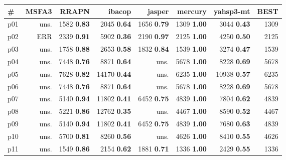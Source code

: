 \begin{tabular}{|l|rrrrrr|r|}
\hline
\textbf{\#} & \textbf{MSFA3} & \textbf{RRAPN} & \textbf{ibacop} & \textbf{jasper} & \textbf{mercury} & \textbf{yahsp3-mt} & \textbf{BEST}\\
\hline
p01 & uns. & {\footnotesize 1582} \textbf{0.83} & {\footnotesize 2045} \textbf{0.64} & {\footnotesize 1656} \textbf{0.79} & {\footnotesize 1309} \textbf{1.00} & {\footnotesize 3044} \textbf{0.43} & 1309\\
p02 & ERR & {\footnotesize 2339} \textbf{0.91} & {\footnotesize 5902} \textbf{0.36} & {\footnotesize 2190} \textbf{0.97} & {\footnotesize 2125} \textbf{1.00} & {\footnotesize 4250} \textbf{0.50} & 2125\\
p03 & uns. & {\footnotesize 1758} \textbf{0.88} & {\footnotesize 2653} \textbf{0.58} & {\footnotesize 1832} \textbf{0.84} & {\footnotesize 1539} \textbf{1.00} & {\footnotesize 3274} \textbf{0.47} & 1539\\
p04 & uns. & {\footnotesize 7448} \textbf{0.76} & {\footnotesize 8871} \textbf{0.64} & uns. & {\footnotesize 5678} \textbf{1.00} & {\footnotesize 8228} \textbf{0.69} & 5678\\
p05 & uns. & {\footnotesize 7628} \textbf{0.82} & {\footnotesize 14170} \textbf{0.44} & uns. & {\footnotesize 6235} \textbf{1.00} & {\footnotesize 10938} \textbf{0.57} & 6235\\
p06 & uns. & {\footnotesize 7448} \textbf{0.76} & {\footnotesize 8871} \textbf{0.64} & uns. & {\footnotesize 5678} \textbf{1.00} & {\footnotesize 8228} \textbf{0.69} & 5678\\
p07 & uns. & {\footnotesize 5140} \textbf{0.94} & {\footnotesize 11802} \textbf{0.41} & {\footnotesize 6452} \textbf{0.75} & {\footnotesize 4839} \textbf{1.00} & {\footnotesize 7804} \textbf{0.62} & 4839\\
p08 & uns. & {\footnotesize 5221} \textbf{0.86} & {\footnotesize 12762} \textbf{0.35} & uns. & {\footnotesize 4467} \textbf{1.00} & {\footnotesize 8590} \textbf{0.52} & 4467\\
p09 & uns. & {\footnotesize 5140} \textbf{0.94} & {\footnotesize 11802} \textbf{0.41} & {\footnotesize 6452} \textbf{0.75} & {\footnotesize 4839} \textbf{1.00} & {\footnotesize 7680} \textbf{0.63} & 4839\\
p10 & uns. & {\footnotesize 5700} \textbf{0.81} & {\footnotesize 8260} \textbf{0.56} & uns. & {\footnotesize 4626} \textbf{1.00} & {\footnotesize 8410} \textbf{0.55} & 4626\\
p11 & uns. & {\footnotesize 1549} \textbf{0.86} & {\footnotesize 2154} \textbf{0.62} & {\footnotesize 1881} \textbf{0.71} & {\footnotesize 1336} \textbf{1.00} & {\footnotesize 2429} \textbf{0.55} & 1336\\

\end{tabular}
